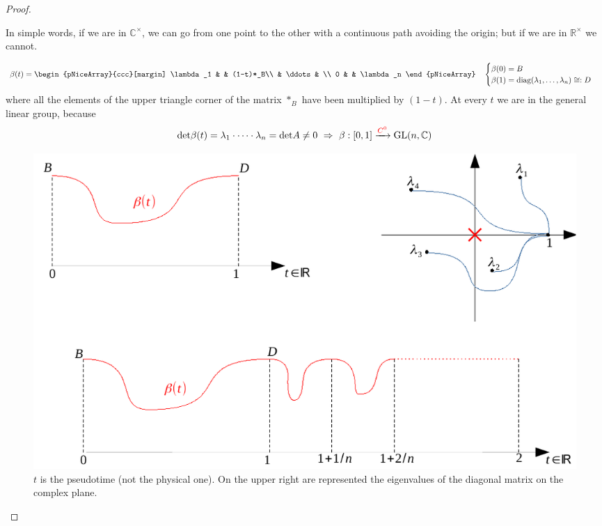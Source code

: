 \documentclass[../main.tex]{subfiles}
\begin{document}
\begin{proof}
\begin{marginfigure}
	\caption[$\textrm{GL}(n,\mathbb{C)}$ is connected]{In simple words, if we are in $\mathbb{C}^\times$, we can go from one point to the other with a continuous path avoiding the origin; but if we are in $\mathbb{R}^\times$ we cannot.}
\end{marginfigure}
\[
\beta(t)=
\begin{pNiceArray}{ccc}[margin]
\lambda_1 & & (1-t)*_B\\ 
 & \ddots & \\
 0 & & \lambda_n 
\end{pNiceArray}
\quad
\begin{cases}
\beta(0)=B \\
\beta(1)=\text{diag}(\lambda_1,\dots,\lambda_n)\cong :D
\end{cases}
\]
where all the elements of the upper triangle corner of the matrix $\ast_B$ have been multiplied by $(1-t)$. At every $t$ we are in the general linear group, because
\[
\text{det}\beta(t)=\lambda_1\cdot\dots\cdot\lambda_n=\text{det}A\ne0\ \Rightarrow \ \beta:[0,1]\xrightarrow[]{{\color{red}C^0}}\text{GL}(n,\mathbb{C})
\]
\begin{figure}[h!]
    \centering
    \includegraphics{images/deformation.pdf}
    \caption[Proof of a theorem for the connectness of GL]{$t$ is the pseudotime (not the physical one). On the upper right are represented the eigenvalues of the diagonal matrix on the complex plane.}
\end{figure}


\end{proof}
\end{document}
